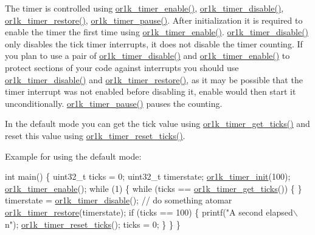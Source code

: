The timer is controlled using \hyperlink{group__or1k__timer_ga369138d63850f2a4dfe216315c31f3d4}{or1k\-\_\-timer\-\_\-enable()}, \hyperlink{group__or1k__timer_gab40473a360aa82273575cdbc4381ac93}{or1k\-\_\-timer\-\_\-disable()}, \hyperlink{group__or1k__timer_ga0e392edcf73b9cf1c0279471ae59d241}{or1k\-\_\-timer\-\_\-restore()}, \hyperlink{group__or1k__timer_ga48cd5b4c0bcc3c0b5ec28326426a66aa}{or1k\-\_\-timer\-\_\-pause()}. After initialization it is required to enable the timer the first time using \hyperlink{group__or1k__timer_ga369138d63850f2a4dfe216315c31f3d4}{or1k\-\_\-timer\-\_\-enable()}. \hyperlink{group__or1k__timer_gab40473a360aa82273575cdbc4381ac93}{or1k\-\_\-timer\-\_\-disable()} only disables the tick timer interrupts, it does not disable the timer counting. If you plan to use a pair of \hyperlink{group__or1k__timer_gab40473a360aa82273575cdbc4381ac93}{or1k\-\_\-timer\-\_\-disable()} and \hyperlink{group__or1k__timer_ga369138d63850f2a4dfe216315c31f3d4}{or1k\-\_\-timer\-\_\-enable()} to protect sections of your code against interrupts you should use \hyperlink{group__or1k__timer_gab40473a360aa82273575cdbc4381ac93}{or1k\-\_\-timer\-\_\-disable()} and \hyperlink{group__or1k__timer_ga0e392edcf73b9cf1c0279471ae59d241}{or1k\-\_\-timer\-\_\-restore()}, as it may be possible that the timer interrupt was not enabled before disabling it, enable would then start it unconditionally. \hyperlink{group__or1k__timer_ga48cd5b4c0bcc3c0b5ec28326426a66aa}{or1k\-\_\-timer\-\_\-pause()} pauses the counting.

In the default mode you can get the tick value using \hyperlink{group__or1k__timer_ga2baa18c5153c793b7d2a85c6e224cea0}{or1k\-\_\-timer\-\_\-get\-\_\-ticks()} and reset this value using \hyperlink{group__or1k__timer_ga456bc40cdfbbbdfd62c936c065457cc2}{or1k\-\_\-timer\-\_\-reset\-\_\-ticks()}.

Example for using the default mode\-:


\begin{DoxyCode}
\textcolor{keywordtype}{int} main() \{
  uint32\_t ticks = 0;
  uint32\_t timerstate;
  \hyperlink{group__or1k__timer_ga432f34016f4f559c29b0be4fbc87e623}{or1k\_timer\_init}(100);
  \hyperlink{group__or1k__timer_ga369138d63850f2a4dfe216315c31f3d4}{or1k\_timer\_enable}();
  \textcolor{keywordflow}{while} (1) \{
    \textcolor{keywordflow}{while} (ticks == \hyperlink{group__or1k__timer_ga2baa18c5153c793b7d2a85c6e224cea0}{or1k\_timer\_get\_ticks}()) \{ \}
    timerstate = \hyperlink{group__or1k__timer_gab40473a360aa82273575cdbc4381ac93}{or1k\_timer\_disable}();
    \textcolor{comment}{// do something atomar}
    \hyperlink{group__or1k__timer_ga0e392edcf73b9cf1c0279471ae59d241}{or1k\_timer\_restore}(timerstate);
    \textcolor{keywordflow}{if} (ticks == 100) \{
      printf(\textcolor{stringliteral}{"A second elapsed\(\backslash\)n"});
      \hyperlink{group__or1k__timer_ga456bc40cdfbbbdfd62c936c065457cc2}{or1k\_timer\_reset\_ticks}();
      ticks = 0;
    \}
  \}
\}
\end{DoxyCode}


